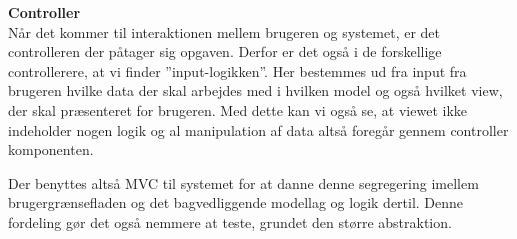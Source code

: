 \textbf{Controller}\\
Når det kommer til interaktionen mellem brugeren og systemet, er det controlleren der påtager sig opgaven.
Derfor er det også i de forskellige controllerere, at vi finder ''input-logikken''. Her bestemmes ud fra input fra brugeren hvilke data der skal arbejdes med i hvilken model og også hvilket view, der skal præsenteret for brugeren. Med dette kan vi også se, at viewet ikke indeholder nogen logik og al manipulation af data altså foregår gennem controller komponenten.


Der benyttes altså MVC til systemet for at danne denne segregering imellem brugergrænsefladen og det bagvedliggende modellag og logik dertil.
Denne fordeling gør det også nemmere at teste, grundet den større abstraktion.
